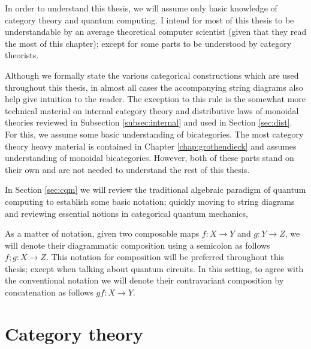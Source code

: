 In order to understand this thesis, we will assume only basic knowledge of category theory and quantum computing.  I intend for most of this thesis to be understandable by an average theoretical computer scientist  (given that they read the most of this chapter); except for some parts to be understood by category theorists.


Although we formally state the various categorical constructions which are used throughout this thesis, in almost all cases the accompanying string diagrams also help give intuition to the reader.  The exception to this rule is the somewhat more technical  material on internal category theory and distributive laws of monoidal theories reviewed in Subsection \ref{subsec:internal} and used in Section \ref{sec:dist}.  For this, we assume some basic understanding of bicategories.  The most category theory heavy material is contained in Chapter \ref{chap:grothendieck} and assumes understanding of monoidal bicategories.  However, both of these parts stand on their own and are not needed to understand the rest of this thesis.

In Section \ref{sec:cqm} we will review the  traditional algebraic paradigm of quantum computing to establish some basic notation; quickly moving to string diagrams and reviewing essential notions in categorical quantum mechanics,

As a matter of notation, given two composable maps $f:X\to Y$ and $g:Y \to Z$, we will denote their diagrammatic composition using a semicolon as follows $f;g:X\to Z$. This notation for composition will be preferred throughout this thesis; except when talking about quantum circuits.  In this setting, to agree with the conventional notation we will denote their contravariant composition by concatenation as follows $gf:X\to Y$.



\section{Category theory}
\label{sec:cat}





